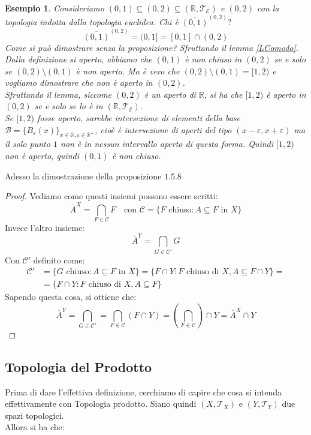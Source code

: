\documentclass[11pt,a4paper,twoside]{article}
\newtheorem{es}{Esempio}
\theoremstyle{definition}
\begin{document}
\begin{es}
	Consideriamo $(0,1) \subseteq (0,2) \subseteq (\mathbb R, \mathcal T_\mathcal E)$ e $(0,2)$ con la topologia indotta dalla topologia euclidea. Chi è $\overline{(0,1)}^{(0,2)}?$
	\[\overline{(0,1)}^{(0,2)} = (0,1] = [0,1] \cap (0,2)\]
	Come si può dimostrare senza la proposizione? Sfruttando il lemma \ref{LComodo}.\\
	Dalla definizione si aperto, abbiamo che $(0,1)$ è non chiuso in $(0,2)$ se e solo se $(0,2)\setminus (0,1)$ è non aperto. Ma è vero che $(0,2)\setminus (0,1) = [1,2)$ e vogliamo dimostrare che non è aperto in $(0,2)$.\\
	Sfruttando il lemma, siccome $(0,2)$ è un aperto di $\mathbb R$, si ha che $[1,2)$ è aperto in $(0,2)$ se e solo se lo è in $(\mathbb R, \mathcal T_\mathcal E)$.\\
	Se $[1,2)$ fosse aperto, sarebbe intersezione di elementi della base $\mathcal B = \{B_\varepsilon(x)\}_{x \in \mathbb R, \varepsilon \in \mathbb R^+}$, cioè è intersezione di aperti del tipo $(x -\varepsilon, x + \varepsilon)$ ma il solo punto $1$ non è in nessun intervallo aperto di questa forma.
	Quindi $[1,2)$ non è aperto, quindi $(0,1)$ è non chiuso.
\end{es}

Adesso la dimostrazione della proposizione $1.5.8$
\begin{proof}
	Vediamo come questi insiemi possono essere scritti:
	\[\overline A^X = \bigcap_{F \in \mathcal C}F \quad \text{con }\mathcal C = \{F \text{ chiuso}: A\subseteq F \text{ in }X\}\]
	Invece l'altro insieme:
	\[\overline A^Y = \bigcap_{G \in \mathcal C'}G\]
	Con $\mathcal C'$ definito come:
	\begin{align*}
		\mathcal C' &= \{G \text{ chiuso}:A \subseteq F \text{ in }X\} = \{F \cap Y: F \text{ chiuso di }X, A \subseteq F \cap Y\} =\\
		&= \{F \cap Y: F \text{ chiuso di }X, A\subseteq F\}
	\end{align*}
	Sapendo questa cosa, si ottiene che:
	\[ \overline A^Y = \bigcap_{G \in \mathcal C'} = \bigcap_{F \in \mathcal C}(F \cap Y) = \left( \bigcap_{F \in \mathcal C}\right) \cap Y = \overline A^X \cap Y\]
\end{proof}

\subsection{Topologia del Prodotto}

Prima di dare l'effettiva definizione, cerchiamo di capire che cosa si intenda effettivamente con Topologia prodotto. Siano quindi $(X, \mathcal T_X)$ e $(Y, \mathcal T_Y)$ due spazi topologici.\\
Allora si ha che:
\end{document}
